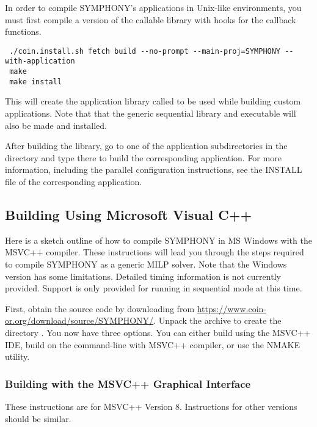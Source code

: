 In order to compile SYMPHONY's applications in Unix-like environments, you
must first compile a version of the callable library with hooks for the
callback functions.
{\color{Brown}
\begin{verbatim}
 ./coin.install.sh fetch build --no-prompt --main-proj=SYMPHONY --with-application
 make 
 make install
\end{verbatim}
} This will create the application library called  to be used
while building custom applications. Note that that the generic sequential
library and executable will also be made and installed.

After building the library, go to one of the application subdirectories in the
 directory and type  there to build
the corresponding application. For more information, including the parallel
configuration instructions, see the INSTALL file of the corresponding
application.

\subsection{Building Using Microsoft Visual C++}
\label{getting_started_windows}

Here is a sketch outline of how to compile SYMPHONY in MS Windows with the
MSVC++ compiler. These instructions will lead you through the steps required
to compile SYMPHONY as a generic MILP solver. Note that the Windows version
has some limitations. Detailed timing information is not currently provided.
Support is only provided for running in sequential mode at this time.

First, obtain the source code by downloading from
\url{https://www.coin-or.org/download/source/SYMPHONY/}. Unpack the archive to
create the directory . You now have three options. You
can either build using the MSVC++ IDE, build on the command-line with MSVC++
compiler, or use the NMAKE utility.

\subsubsection{Building with the MSVC++ Graphical Interface}
\label{using_msvc}

These instructions are for MSVC++ Version 8. Instructions for other versions
should be similar.

